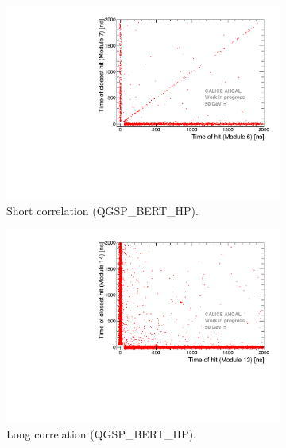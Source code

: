 \begin{figure}[htbp!]
	\begin{subfigure}[t]{0.5\textwidth}
		\centering
		\includegraphics[width=1\textwidth]{chap5/fig_AHCAL_timing/Pions/ComparisonToSim/Time_Correlation_50GeV_short_QGSPBERTHP.pdf}
		\caption{Short correlation (QGSP\_BERT\_HP).} \label{fig:Corr_short_QGSPBERTHP}
	\end{subfigure}
	\hfill
	\begin{subfigure}[t]{0.5\textwidth}
		\centering
		\includegraphics[width=1\textwidth]{chap5/fig_AHCAL_timing/Pions/ComparisonToSim/Time_Correlation_50GeV_long_QGSPBERTHP.pdf}
		\caption{Long correlation (QGSP\_BERT\_HP).} \label{fig:Corr_long_QGSPBERTHP}
	\end{subfigure}
	\hfill
	\begin{subfigure}[t]{0.5\textwidth}

\end{subfigure}
\end{figure}
